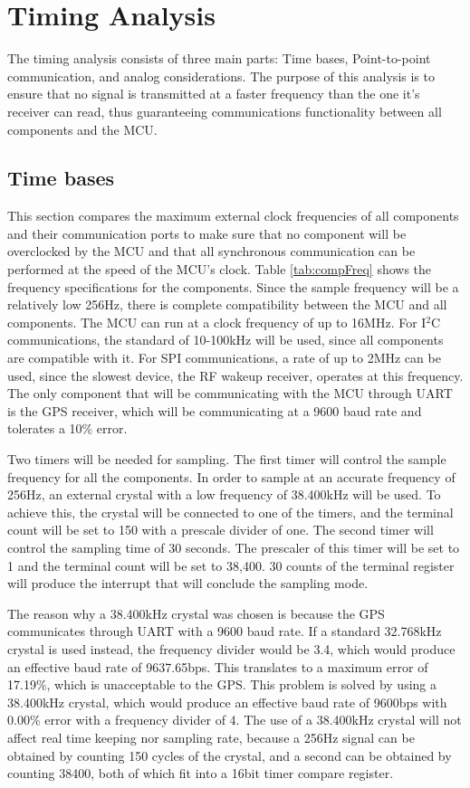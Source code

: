 \section{Timing Analysis}
The timing analysis consists of three main parts: Time bases, Point-to-point communication, and analog considerations. The purpose of this analysis is to ensure that no signal is transmitted at a faster frequency than the one it's receiver can read, thus guaranteeing communications functionality between all components and the MCU.

\subsection{Time bases}
This section compares the maximum external clock frequencies of all components and their communication ports to make sure that no component will be overclocked by the MCU and that all synchronous communication can be performed at the speed of the MCU's clock. Table \ref{tab:compFreq} shows the frequency specifications for the components.  Since the sample frequency will be a relatively low 256Hz, there is complete compatibility between the MCU and all components. The MCU can run at a clock frequency of up to 16MHz. For I$^2$C communications, the standard of 10-100kHz will be used, since all components are compatible with it. For SPI communications, a rate of up to 2MHz can be used, since the slowest device, the RF wakeup receiver, operates at this frequency. The only component that will be communicating with the MCU through UART is the GPS receiver, which will be communicating at a 9600 baud rate and tolerates a 10\% error.

Two timers will be needed for sampling. The first timer will control the sample frequency for all the components.  In order to sample at an accurate frequency of 256Hz, an external crystal with a low frequency of 38.400kHz will be used. To achieve this, the crystal will be connected to one of the timers, and the terminal count will be set to 150 with a prescale divider of one. The second timer will control the sampling time of 30 seconds. The prescaler of this timer will be set to 1 and the terminal count will be set to 38,400. 30 counts of the terminal register will produce the interrupt that will conclude the sampling mode.

The reason why a 38.400kHz crystal was chosen is because the GPS communicates through UART with a 9600 baud rate. If a standard 32.768kHz crystal is used instead, the frequency divider would be 3.4, which would produce an effective baud rate of 9637.65bps. This translates to a maximum error of 17.19\%, which is unacceptable to the GPS. This problem is solved by using a 38.400kHz crystal, which would produce an effective baud rate of 9600bps with 0.00\% error with a frequency divider of 4. The use of a 38.400kHz crystal will not affect real time keeping nor sampling rate, because a 256Hz signal can be obtained by counting 150 cycles of the crystal, and a second can be obtained by counting 38400, both of which fit into a 16bit timer compare register.

